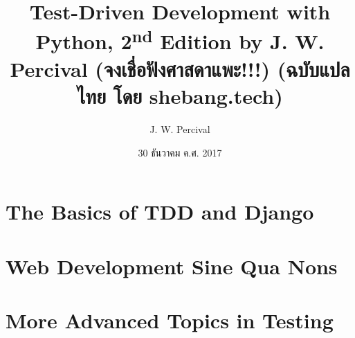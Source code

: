\documentclass[a4paper]{book}
\begin{document}
  \frontmatter
  \title{Test-Driven Development with Python, 2\textsuperscript{nd} Edition by
  J. W. Percival (จงเชื่อฟังศาสดาแพะ!!!) (ฉบับแปลไทย โดย shebang.tech)}

  \author{J. W. Percival}

  \date{30 ธันวาคม ค.ศ. 2017}

  \maketitle

  
  
  
  
  

  \tableofcontents
  \listoffigures
  \listoftables

  \mainmatter

  \part{The Basics of TDD and Django}
  
  
  
  
  
  
  

  \part{Web Development Sine Qua Nons}
  
  
  
  
  
  
  
  
  
  

  \part{More Advanced Topics in Testing}
  
  
  
  
  
  
  
  
  

  
  
  
  
  
  
  
  
  
  
  
  

  \backmatter
  \listoftodos
\end{document}
